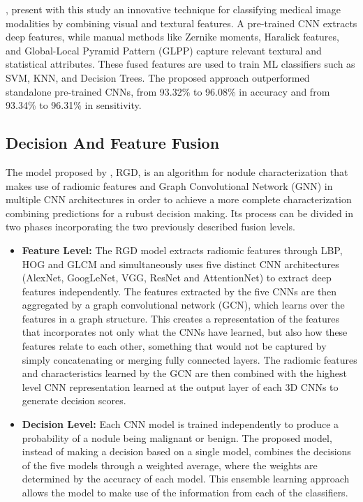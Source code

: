 \citet{iqbal_fusion_2023}, present with this study an innovative technique for classifying medical image modalities by combining visual and textural features. A pre-trained CNN extracts deep features, while manual methods like Zernike moments, Haralick features, and Global-Local Pyramid Pattern (GLPP) capture relevant textural and statistical attributes. These fused features are used to train ML classifiers such as SVM, KNN, and Decision Trees. The proposed approach outperformed standalone pre-trained CNNs, from 93.32\% to 96.08\% in accuracy and from 93.34\% to 96.31\% in sensitivity.

\subsection{Decision And Feature Fusion}

The model proposed by \citet{ma_novel_2023}, RGD, is an algorithm for nodule characterization that makes use of radiomic features and Graph Convolutional Network (GNN) in multiple CNN architectures in order to achieve a more complete characterization combining predictions for a rubust decision making.
Its process can be divided in two phases incorporating the two previously described fusion levels.
\begin{itemize}
    \item \textbf{Feature Level:} The RGD model extracts radiomic features through LBP, HOG and GLCM and simultaneously uses five distinct CNN architectures (AlexNet, GoogLeNet, VGG, ResNet and AttentionNet) to extract deep features independently.
    The features extracted by the five CNNs are then aggregated by a graph convolutional network (GCN), which learns over the features in a graph structure. This creates a representation of the features that incorporates not only what the CNNs have learned, but also how these features relate to each other, something that would not be captured by simply concatenating or merging fully connected layers.
    The radiomic features and characteristics learned by the GCN are then combined with the highest level CNN representation learned at the output layer of each 3D CNNs to generate decision scores. 
    
    \item \textbf{Decision Level:} Each CNN model is trained independently to produce a probability of a nodule being malignant or benign.
    The proposed model, instead of making a decision based on a single model, combines the decisions of the five models through a weighted average, where the weights are determined by the accuracy of each model. This ensemble learning approach allows the model to make use of the information from each of the classifiers.
\end{itemize}

